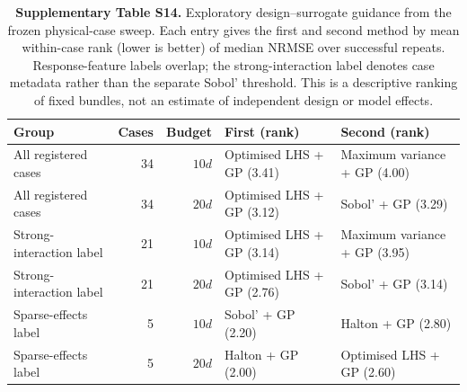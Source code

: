 \begin{table}[H]
\centering
\caption{\textbf{Supplementary Table S14.} Exploratory design--surrogate guidance from the frozen physical-case sweep. Each entry gives the first and second method by mean within-case rank (lower is better) of median NRMSE over successful repeats. Response-feature labels overlap; the strong-interaction label denotes case metadata rather than the separate Sobol' threshold. This is a descriptive ranking of fixed bundles, not an estimate of independent design or model effects.}
\label{tab:si_design_model_guidance}
\SITableFont
\setlength{\tabcolsep}{4pt}
\begin{tabular}{@{}lrrll@{}}
\toprule
Group & Cases & Budget & First (rank) & Second (rank) \\
\midrule
All registered cases & 34 & $10d$ & Optimised LHS + GP (3.41) & Maximum variance + GP (4.00) \\
All registered cases & 34 & $20d$ & Optimised LHS + GP (3.12) & Sobol' + GP (3.29) \\
Strong-interaction label & 21 & $10d$ & Optimised LHS + GP (3.14) & Maximum variance + GP (3.95) \\
Strong-interaction label & 21 & $20d$ & Optimised LHS + GP (2.76) & Sobol' + GP (3.14) \\
Sparse-effects label & 5 & $10d$ & Sobol' + GP (2.20) & Halton + GP (2.80) \\
Sparse-effects label & 5 & $20d$ & Halton + GP (2.00) & Optimised LHS + GP (2.60) \\
\bottomrule
\end{tabular}
\end{table}
